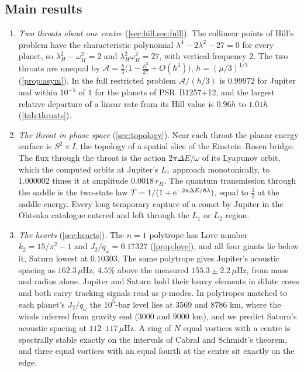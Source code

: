 \documentclass[11pt]{article}
\theoremstyle{definition}\newtheorem{definition}[theorem]{Definition}
\theoremstyle{remark}\newtheorem{remark}[theorem]{Remark}
\newcommand{\muH}{\,\mu\mathrm{Hz}}
\begin{document}
\subsection{Main results}\label{sec:main}
\begin{enumerate}[label=\textbf{\arabic*.},leftmargin=1.8em]
\item \emph{Two throats about one centre} (\cref{sec:hill,sec:full}). The collinear points of Hill's problem have the characteristic polynomial $\lambda^4-2\lambda^2-27=0$ for every planet, so $\lambda_H^2-\omega_H^2=2$ and $\lambda_H^2\omega_H^2=27$, with vertical frequency $2$. The two throats are unequal by $\mathcal A=\frac h3\bigl(1-\frac{h^2}{27}+O(h^3)\bigr)$, $h=(\mu/3)^{1/3}$ (\cref{prop:asym}). In the full restricted problem $\mathcal A/(h/3)$ is $0.99972$ for Jupiter and within $10^{-5}$ of $1$ for the planets of PSR~B1257+12, and the largest relative departure of a linear rate from its Hill value is $0.96h$ to $1.01h$ (\cref{tab:throats}).
\item \emph{The throat in phase space} (\cref{sec:topology}). Near each throat the planar energy surface is $S^2\times I$, the topology of a spatial slice of the Einstein--Rosen bridge. The flux through the throat is the action $2\pi\Delta E/\omega$ of its Lyapunov orbit, which the computed orbits at Jupiter's $L_1$ approach monotonically, to $1.000002$ times it at amplitude $0.0018\,r_H$. The quantum transmission through the saddle is the two-state law $T=1/(1+\mathrm e^{-2\pi\Delta E/\hbar\lambda})$, equal to $\frac12$ at the saddle energy. Every long temporary capture of a comet by Jupiter in the Ohtsuka catalogue entered and left through the $L_1$ or $L_2$ region.
\item \emph{The hearts} (\cref{sec:hearts}). The $n=1$ polytrope has Love number $k_2=15/\pi^2-1$ and $J_2/q_\omega=0.17327$ (\cref{prop:love}), and all four giants lie below it, Saturn lowest at $0.10303$. The same polytrope gives Jupiter's acoustic spacing as $162.3\muH$, $4.5\%$ above the measured $155.3\pm2.2\muH$, from mass and radius alone. Jupiter and Saturn hold their heavy elements in dilute cores and both carry tracking signals read as p-modes. In polytropes matched to each planet's $J_2/q_\omega$ the $10^5$-bar level lies at $3569$ and $8786$ km, where the winds inferred from gravity end ($3000$ and $9000$ km), and we predict Saturn's acoustic spacing at $112$--$117\muH$. A ring of $N$ equal vortices with a centre is spectrally stable exactly on the intervals of Cabral and Schmidt's theorem, and three equal vortices with an equal fourth at the centre sit exactly on the edge.

\end{enumerate}
\end{document}
